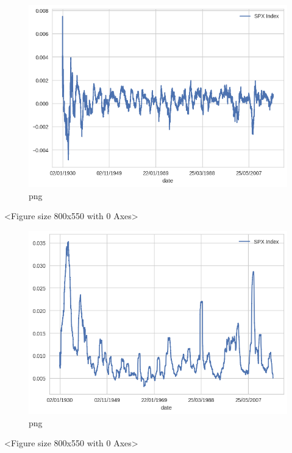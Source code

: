 \begin{figure}[h]
\centering
\includegraphics[scale=0.75]{ProcessingStockPriceData_files/ProcessingStockPriceData_8_1.png}
\caption{png}
\end{figure}

\begin{python}
<Figure size 800x550 with 0 Axes>
\end{python}

\begin{figure}[h]
\centering
\includegraphics[scale=0.75]{ProcessingStockPriceData_files/ProcessingStockPriceData_8_3.png}
\caption{png}
\end{figure}

\begin{python}
<Figure size 800x550 with 0 Axes>
\end{python}

